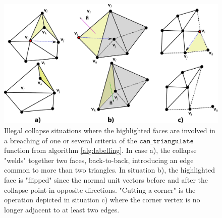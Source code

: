 \documentclass[graybox]{svmult}
\begin{document}
\begin{figure}[htb]
	\centering 
	\includegraphics[width=.95\columnwidth]{forbidden_collapses.pdf} 
	\caption{Illegal collapse situations where the highlighted faces are involved in a breaching of one or several criteria of the $\mathtt{can\_triangulate}$ function from algorithm  \ref{alg:labelling}. In case a), the collapse "welds" together two faces, back-to-back, introducing an edge common to more than two triangles. In situation b), the highlighted face is "flipped" since the normal unit vectors before and after the collapse point in opposite directions. "Cutting a corner" is the operation depicted in situation c) where the corner vertex is no longer adjacent to at least two edges.} 
	\label{fig_cds:forbidden_collapses} 
\end{figure}
\end{document}
